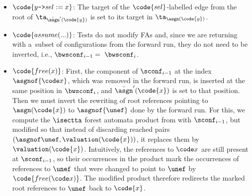 \begin{itemize}
  \item $\code{y\text{\texttt{->}}sel := x}$:
The target of the $\code{sel}$-labelled edge from the root of
$\ta_{\bar\asgn'(\code{y})}$ is set to its target in $\ta_{\asgn(\code{y})}$.
 \item $\code{assume(...)}$: Tests do not modify FAs and, since we are returning
   with a~subset of configurations from the forward run, they do not need to be
    inverted, i.e., $\bwsconf_{i-1} =~\bwsconf_{i}$.
  \item $\code{free(x)}$:
First, the component of $\sconf_{i-1}$ at the index $\asgnof{\code x}$, which was
removed in the forward run, is inserted at the same position in $\bwsconf_{i}$, and
$\bar\asgn'(\code{x})$ is set to that position.
%
Then we must invert the rewriting of root references pointing to $\asgn(\code{x})$ to $\asgnof{\unef}$ done by the forward run.
For this, we compute the $\isectta$ forest automata product from  with $\sconf_{i-1}$, but modified so that 
instead of discarding reached pairs $(\asgnof\unef,\valuation(\code{x}))$, 
it replaces them by $\valuation(\code{x})$.
%
Intuitively, the references to $\code x$ are still present at $\sconf_{i-1}$,
so their occurrences in the product mark the occurrences of references to $\unef$ 
that were changed to point to $\unef$ by $\code{free(\code x)}$. The modified product therefore 
redirects  
the marked root references to $\unef$ back to $\code{x}$.


\end{itemize}
